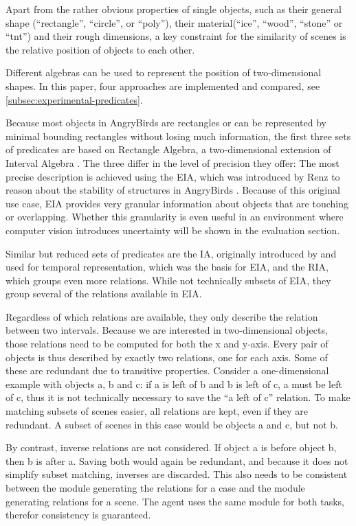 Apart from the rather obvious properties of single objects, such as their general shape (``rectangle'', ``circle'', or ``poly''), their material(``ice'', ``wood'', ``stone'' or ``tnt'') and their rough dimensions, a key constraint for the similarity of scenes is the relative position of objects to each other.

Different algebras can be used to represent the position of two-dimensional shapes. In this paper, four approaches are implemented and compared, see \ref{subsec:experimental-predicates}.

Because most objects in AngryBirds are rectangles or can be represented by minimal bounding rectangles without losing much information, the first three sets of predicates are based on Rectangle Algebra, a two-dimensional extension of Interval Algebra \cite{Balbiani1999ANT}. The three differ in the level of precision they offer:
The most precise description is achieved using the \ac{EIA}, which was introduced by Renz to reason about the stability of structures in AngryBirds \cite{Renz-ERA}. Because of this original use case, \ac{EIA} provides very granular information about objects that are touching or overlapping.
Whether this granularity is even useful in an environment where computer vision introduces uncertainty will be shown in the evaluation section.

Similar but reduced sets of predicates are the \ac{IA}, originally introduced by \cite{Allen-10.1145/182.358434} and used for temporal representation, which was the basis for \ac{EIA}, and the \ac{RIA}, which groups even more relations. While not technically subsets of EIA, they group several of the relations available in EIA.

Regardless of which relations are available, they only describe the relation between two intervals. Because we are interested in two-dimensional objects, those relations need to be computed for both the x and y-axis. Every pair of objects is thus described by exactly two relations, one for each axis. Some of these are redundant due to transitive properties.
Consider a one-dimensional example with objects a, b and c: if a is left of b and b is left of c, a must be left of c, thus it is not technically necessary to save the ``a left of c''  relation.
To make matching subsets of scenes easier, all relations are kept, even if they are redundant. A subset of scenes in this case would be objects a and c, but not b.

By contrast, inverse relations are not considered. If object a is before object b, then b is after a. Saving both would again be redundant, and because it does not simplify subset matching, inverses are discarded. This also needs to be consistent between the module generating the relations for a case and the module generating relations for a scene. The agent uses the same module for both tasks, therefor consistency is guaranteed.

